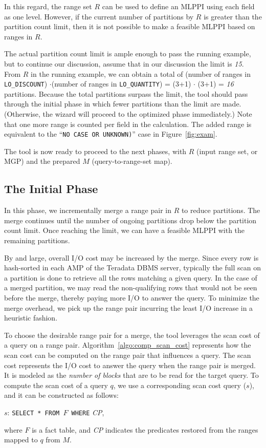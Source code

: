 \documentclass[paper]{ieice}
\begin{document}
In this regard, the range set $R$ can be used to define an MLPPI using each field as one level. 
However, if the current number of partitions by $R$ is greater than 
the partition count limit, 
then it is not possible to make a feasible MLPPI based on ranges in $R$. 

The actual partition count limit is ample enough to pass the running example, 
but to continue our discussion, assume that in our discussion the limit is {\it 15}.
From $R$ in the running example, we can obtain a total of (number of ranges in {\tt LO\_DISCOUNT}) 
$\cdot$(number of ranges in {\tt LO\_QUANTITY}) = (3+1) $\cdot$ (3+1) = {\it 16}
partitions. 
Because the total partitions surpass the limit, 
the tool should pass through the initial phase in which 
fewer partitions than the limit are made. 
(Otherwise, the wizard will proceed to the optimized phase immediately.) 
Note that one more range is counted per field in the calculation. 
The added range is equivalent to the ``{\tt NO CASE OR UNKNOWN)}'' case in Figure~\ref{fig:exam}. 

The tool is now ready to proceed to the next phases, 
with $R$ (input range set, or MGP) and the prepared $M$ (query-to-range-set map). 

\subsection{The Initial Phase}
\label{sec:init_phase}

In this phase, we incrementally merge a range pair in $R$ to reduce partitions. 
The merge continues until the number of ongoing partitions 
drop below the partition count limit. 
Once reaching the limit, we can have a feasible MLPPI with 
the remaining partitions. 

By and large, overall I/O cost may be increased by the merge. 
Since every row is hash-sorted in each AMP of the Teradata DBMS server, 
typically the full scan on a partition is done to retrieve 
all the rows matching a given query. 
In the case of a merged partition, we may read the non-qualifying rows 
that would not be seen before the merge, thereby paying more I/O to answer 
the query.  
To minimize the merge overhead, we pick up the range pair incurring 
the least I/O increase in a heuristic fashion.

To choose the desirable range pair for a merge, 
the tool leverages the scan cost of a query on a range pair.
Algorithm~\ref{algo:comp_scan_cost} represents how 
the scan cost can be computed on the range pair that \hbox{influences} a query. 
The scan cost represents the I/O cost to answer the query when the range pair is merged. It is 
modeled as the {\em number of blocks} that are to be read 
for the target query. To compute the scan cost of a query $q$, we use 
a corresponding scan cost query ($s$), and 
it can be constructed as follows: 
\begin{center}
$s$: {\tt SELECT * FROM $F$ WHERE} {\it CP},
\end{center} 
where $F$ is a fact table, and 
{\it CP} indicates the predicates  
restored from the ranges mapped to $q$ from $M$.
\end{document}
